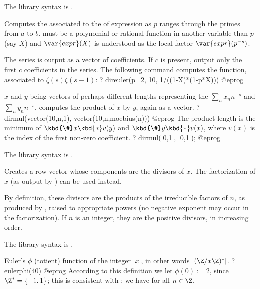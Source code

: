 The library syntax is .

\label{se:direuler}
Computes the  associated to the
 of expression  as $p$ ranges through the primes
from $a$
to $b$.  must be a polynomial or rational function in another
variable than $p$ (say $X$) and $\var{expr}(X)$ is understood as the local
factor $\var{expr}(p^{-s})$.

The series is output as a vector of coefficients. If $c$ is present, output
only the first $c$ coefficients in the series. The following command computes
the  function, associated to $\zeta(s)\zeta(s-1)$:
\bprog
? direuler(p=2, 10, 1/((1-X)*(1-p*X)))
@eprog


\label{se:dirmul}
$x$ and $y$ being vectors of perhaps different lengths representing
the  $\sum_n x_n n^{-s}$ and $\sum_n y_n n^{-s}$,
computes the product of $x$ by $y$, again as a vector.
\bprog
? dirmul(vector(10,n,1), vector(10,n,moebius(n)))
@eprog\noindent
The product
length is the minimum of $\kbd{\#}x\kbd{*}v(y)$ and $\kbd{\#}y\kbd{*}v(x)$,
where $v(x)$ is the index of the first non-zero coefficient.
\bprog
? dirmul([0,1], [0,1]);
@eprog

The library syntax is .

\label{se:divisors}
Creates a row vector whose components are the
divisors of $x$. The factorization of $x$ (as output by ) can
be used instead.

By definition, these divisors are the products of the irreducible
factors of $n$, as produced by , raised to appropriate
powers (no negative exponent may occur in the factorization). If $n$ is
an integer, they are the positive divisors, in increasing order.

The library syntax is .

\label{se:eulerphi}
Euler's $\phi$ (totient) function of the
integer $|x|$, in other words $|(\Z/x\Z)^*|$.
\bprog
? eulerphi(40)
@eprog\noindent
According to this definition we let $\phi(0) := 2$, since $\Z^* = \{-1,1\}$;
this is consistent with : we have  for all $n\in\Z$.

